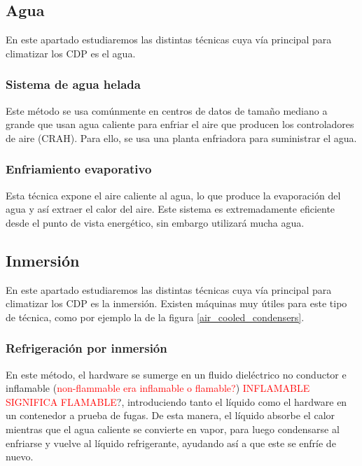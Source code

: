 \subsection{Agua} \label{awa}

En este apartado estudiaremos las distintas técnicas cuya vía principal para climatizar los CDP es el agua.

\subsubsection{Sistema de agua helada}

Este método se usa comúnmente en centros de datos de tamaño mediano a grande que usan agua caliente para enfriar el aire que producen los controladores de aire (CRAH). Para ello, se usa una planta enfriadora para suministrar el agua.

\subsubsection{Enfriamiento evaporativo}

Esta técnica expone el aire caliente al agua, lo que produce la evaporación del agua y así extraer el calor del aire. Este sistema es extremadamente eficiente desde el punto de vista energético, sin embargo utilizará mucha agua.

\subsection{Inmersión} \label{inmersion}

En este apartado estudiaremos las distintas técnicas cuya vía principal para climatizar los CDP es la inmersión. Existen máquinas muy útiles para este tipo de técnica, como por ejemplo la de la figura \eqref{air_cooled_condensers}.

\subsubsection{Refrigeración por inmersión}

En este método, el hardware se sumerge en un fluido dieléctrico no conductor e inflamable (\textcolor{red}{non-flammable era inflamable o flamable?}) \textcolor{red}{INFLAMABLE SIGNIFICA FLAMABLE}?, introduciendo tanto el líquido como el hardware en un contenedor a prueba de fugas. De esta manera, el líquido absorbe el calor mientras que el agua caliente se convierte en vapor, para luego condensarse al enfriarse y vuelve al líquido refrigerante, ayudando así a que este se enfríe de nuevo.

